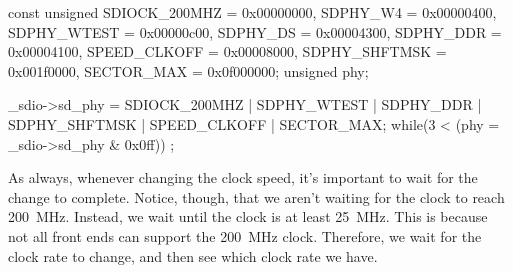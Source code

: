 \documentclass{gqtekspec}
\begin{document}
\begin{zCpp}
	const	unsigned	SDIOCK_200MHZ = 0x00000000,
				SDPHY_W4      = 0x00000400,
				SDPHY_WTEST   = 0x00000c00,
				SDPHY_DS      = 0x00004300,
				SDPHY_DDR     = 0x00004100,
				SPEED_CLKOFF  = 0x00008000,
				SDPHY_SHFTMSK = 0x001f0000,
				SECTOR_MAX    = 0x0f000000;
	unsigned	phy;

	_sdio->sd_phy = SDIOCK_200MHZ | SDPHY_WTEST | SDPHY_DDR
			| SDPHY_SHFTMSK | SPEED_CLKOFF | SECTOR_MAX;
	while(3 < (phy = _sdio->sd_phy & 0x0ff))
		;
\end{zCpp}

As always, whenever changing the clock speed, it's important to wait for
the change to complete.  Notice, though, that we aren't waiting for the
clock to reach 200~MHz.  Instead, we wait until the clock is at least 25~MHz.
This is because not all front ends can support the 200~MHz clock.  Therefore,
we wait for the clock rate to change, and then see which clock rate we have.
\end{document}
